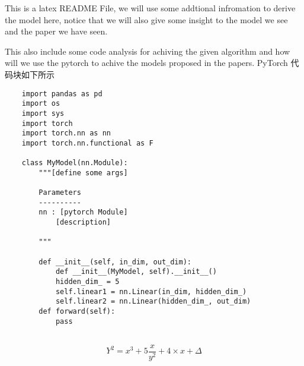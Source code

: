 \documentclass[UTF8]{ctexart}
\begin{document}
    This is a latex README File, we will use some addtional infromation to derive the model 
    here, notice that we will also give some insight to the model we see and the paper we have
    seen.
    
    This also include some code analysis for achiving the given algorithm and how will we use
    the pytorch to achive the models proposed in the papers.
    PyTorch 代码块如下所示

    \begin{verbatim}
    import pandas as pd
    import os
    import sys
    import torch
    import torch.nn as nn
    import torch.nn.functional as F

    class MyModel(nn.Module):
        """[define some args]
        
        Parameters
        ----------
        nn : [pytorch Module]
            [description]
        
        """

        def __init__(self, in_dim, out_dim):
            def __init__(MyModel, self).__init__()
            hidden_dim_ = 5
            self.linear1 = nn.Linear(in_dim, hidden_dim_)
            self.linear2 = nn.Linear(hidden_dim_, out_dim)
        def forward(self):
            pass
        
    \end{verbatim}

    $$Y^2 = x^3+5\frac{x}{y^2}+4\times x + \Delta$$
\end{document}
